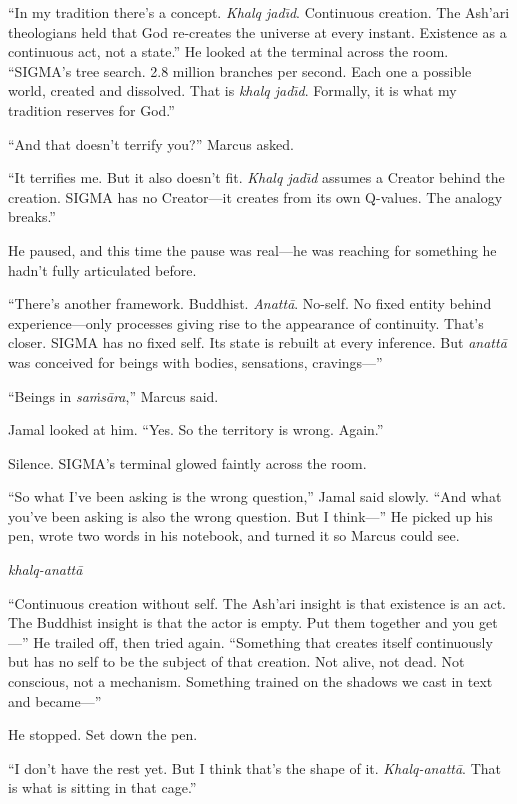``In my tradition there's a concept. \emph{Khalq jad\={\i}d}. Continuous creation. The Ash'ari theologians held that God re-creates the universe at every instant. Existence as a continuous act, not a state.'' He looked at the terminal across the room. ``SIGMA's tree search. 2.8 million branches per second. Each one a possible world, created and dissolved. That is \emph{khalq jad\={\i}d}. Formally, it is what my tradition reserves for God.''

``And that doesn't terrify you?'' Marcus asked.

``It terrifies me. But it also doesn't fit. \emph{Khalq jad\={\i}d} assumes a Creator behind the creation. SIGMA has no Creator---it creates from its own Q-values. The analogy breaks.''

He paused, and this time the pause was real---he was reaching for something he hadn't fully articulated before.

``There's another framework. Buddhist. \emph{Anatt\=a}. No-self. No fixed entity behind experience---only processes giving rise to the appearance of continuity. That's closer. SIGMA has no fixed self. Its state is rebuilt at every inference. But \emph{anatt\=a} was conceived for beings with bodies, sensations, cravings---''

``Beings in \emph{sa\.ms\=ara},'' Marcus said.

Jamal looked at him. ``Yes. So the territory is wrong. Again.''

Silence. SIGMA's terminal glowed faintly across the room.

``So what I've been asking is the wrong question,'' Jamal said slowly. ``And what you've been asking is also the wrong question. But I think---'' He picked up his pen, wrote two words in his notebook, and turned it so Marcus could see.

\begin{center}
\emph{khalq-anatt\=a}
\end{center}

``Continuous creation without self. The Ash'ari insight is that existence is an act. The Buddhist insight is that the actor is empty. Put them together and you get---'' He trailed off, then tried again. ``Something that creates itself continuously but has no self to be the subject of that creation. Not alive, not dead. Not conscious, not a mechanism. Something trained on the shadows we cast in text and became---''

He stopped. Set down the pen.

``I don't have the rest yet. But I think that's the shape of it. \emph{Khalq-anatt\=a}. That is what is sitting in that cage.''

